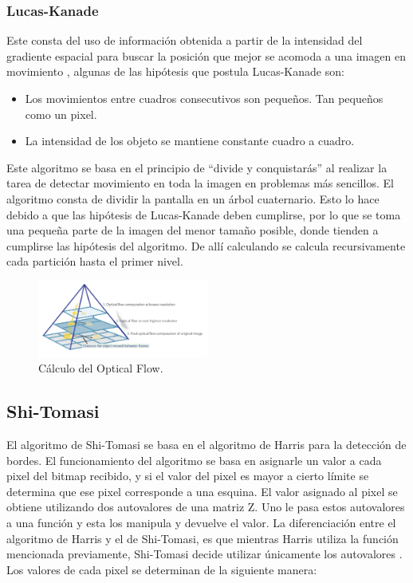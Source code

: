 \subsubsection{Lucas-Kanade} 
 Este consta del uso de información obtenida a partir de la intensidad del gradiente espacial para buscar la posición que mejor se acomoda a una imagen en movimiento \cite{ref:lucas-kanade} \cite{ref:lucas-kanade2}, algunas de las hipótesis que postula Lucas-Kanade son:
\begin{itemize}
\item Los movimientos entre cuadros consecutivos son pequeños. Tan pequeños como un pixel.
\item La intensidad de los objeto se mantiene constante cuadro a cuadro.
\end{itemize} 
Este algoritmo se basa en el principio de ``divide y conquistarás'' al realizar la tarea de detectar movimiento en toda la imagen en problemas más sencillos. El algoritmo consta de dividir la pantalla en un árbol cuaternario. Esto lo hace debido a que las hipótesis de Lucas-Kanade deben cumplirse, por lo que se toma una pequeña parte de la imagen del menor tamaño posible, donde tienden a cumplirse las hipótesis del algoritmo. De allí calculando se calcula recursivamente cada partición hasta el primer nivel.
\begin{figure}[H]
		\centering
		\includegraphics[width=0.5\textwidth]{Imagenes/op.png}
		\caption{Cálculo del Optical Flow.}
		\label{fig:opticalflow1}
\end{figure}
\subsection{Shi-Tomasi}

El algoritmo de Shi-Tomasi se basa en el algoritmo de Harris para la detección de bordes. El funcionamiento del algoritmo se basa en asignarle un valor a cada pixel del bitmap recibido, y si el valor del pixel es mayor a cierto límite se determina que ese pixel corresponde a una esquina. El valor asignado al pixel se obtiene utilizando dos autovalores de una matriz Z. Uno le pasa estos autovalores a una función y esta los manipula y devuelve el valor.
La diferenciación entre el algoritmo de Harris y el de Shi-Tomasi, es que mientras Harris utiliza la función mencionada previamente, Shi-Tomasi decide utilizar únicamente los autovalores \cite{ref:shi-tomasi}.
\\ Los valores de cada pixel se determinan de la siguiente manera:

